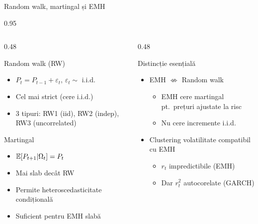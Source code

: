 \documentclass[9pt, aspectratio=169, t]{beamer}
\begin{document}
\begin{frame}[shrink=15]{Random walk, martingal și EMH}
\begin{cminipage}{0.95\textwidth}
\begin{columns}[T]
\begin{column}{0.48\textwidth}
\begin{block}{Random walk (RW)}
\begin{itemize}\setlength{\itemsep}{0pt}
    \item $P_t = P_{t-1} + \varepsilon_t$, $\varepsilon_t \sim$ i.i.d.
    \item Cel mai strict (cere i.i.d.)
    \item 3 tipuri: RW1 (iid), RW2 (indep), RW3 (uncorrelated)
\end{itemize}
\end{block}

\begin{block}{Martingal}
\begin{itemize}\setlength{\itemsep}{0pt}
    \item $\mathbb{E}[P_{t+1} | \Omega_t] = P_t$
    \item Mai slab decât RW
    \item Permite heteroscedasticitate condițională
    \item Suficient pentru EMH slabă
\end{itemize}
\end{block}
\end{column}
\begin{column}{0.48\textwidth}
\begin{alertblock}{Distincție esențială}
\begin{itemize}\setlength{\itemsep}{0pt}
    \item EMH $\not\Leftrightarrow$ Random walk
    \begin{itemize}\setlength{\itemsep}{0pt}
        \item EMH cere martingal pt.\ prețuri ajustate la risc
        \item Nu cere incremente i.i.d.
    \end{itemize}
    \item Clustering volatilitate compatibil cu EMH
    \begin{itemize}\setlength{\itemsep}{0pt}
        \item $r_t$ impredictibile (EMH)
        \item Dar $r_t^2$ autocorelate (GARCH)
    \end{itemize}
\end{itemize}
\end{alertblock}
\end{column}
\end{columns}
\end{cminipage}
\vspace{0.05cm}
\end{frame}
\end{document}
